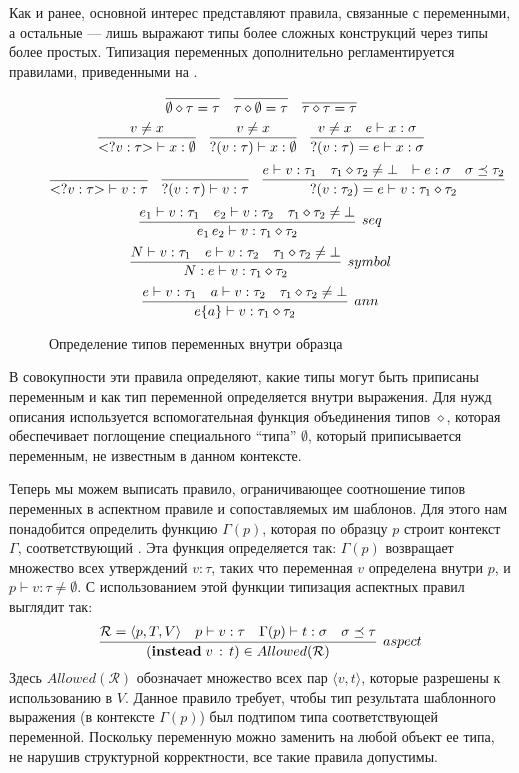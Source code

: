 Как и ранее, основной интерес представляют правила, связанные с переменными, а остальные --- лишь выражают типы более сложных конструкций через типы более простых. Типизация переменных дополнительно регламентируется правилами, приведенными на .
\newcommand{\tcomp}{\diamond}
\begin{figure}[htbp]
	\centering
$$
	\infer{\emptyset \tcomp \tau = \tau}{}
	\quad
	\infer{\tau \tcomp \emptyset = \tau}{}
	\quad
	\infer{\tau \tcomp \tau = \tau}{}
$$
$$
	\infer{\wcard{?v}{\tau} \vdash x : \emptyset}{v \neq x}
	\quad
	\infer{?(v : \tau) \vdash x : \emptyset}{v \neq x}
	\quad
	\infer{?(v : \tau) = e \vdash x : \sigma}{v \neq x & e \vdash x : \sigma}
$$
$$
	\infer{\wcard{?v}{\tau} \vdash v : \tau}{}
	\quad
	\infer{?(v : \tau) \vdash v : \tau}{}
	\quad
	\infer{?(v : \tau_2) = e \vdash v : \tau_1 \tcomp \tau_2}{
		e \vdash v : \tau_1 & 
		\tau_1 \tcomp \tau_2 \neq \bot &
		\vdash e : \sigma & \sigma \preceq \tau_2
	}
$$
$$
	\infer[seq]{e_1 \, e_2 \vdash v : \tau_1 \tcomp \tau_2}{
		e_1 \vdash v : \tau_1 & 
		e_2 \vdash v : \tau_2 & 
		\tau_1 \tcomp \tau_2 \neq \bot
	}
$$
$$
	\infer[symbol]{N : e \vdash v : \tau_1 \tcomp \tau_2}{
		N \vdash v : \tau_1 & 
		e \vdash v : \tau_2 & 
		\tau_1 \tcomp \tau_2 \neq \bot
	}
$$
$$
	\infer[ann]{e\{a\} \vdash v : \tau_1 \tcomp \tau_2}{
		e \vdash v : \tau_1 & 
		a \vdash v : \tau_2 & 
		\tau_1 \tcomp \tau_2 \neq \bot
	}
$$
	\caption{Определение типов переменных внутри образца}\label{VarTypes}
\end{figure}
В совокупности эти правила определяют, какие типы могут быть приписаны переменным и как тип переменной определяется внутри выражения. Для нужд описания используется вспомогательная функция объединения типов $\tcomp$, которая обеспечивает поглощение специального ``типа'' $\emptyset$, который приписывается переменным, не известным в данном контексте.

Теперь мы можем выписать правило, ограничивающее соотношение типов переменных в аспектном правиле и сопоставляемых им шаблонов. Для этого нам понадобится определить функцию $\Gamma(p)$, которая по образцу $p$ строит контекст $\Gamma$, соответствующий . Эта функция определяется так: $\Gamma(p)$ возвращает множество всех утверждений $v : \tau$, таких что переменная $v$ определена внутри $p$, и $p \vdash v : \tau \neq \emptyset$. С использованием этой функции типизация аспектных правил выглядит так:
$$
	\infer[aspect]{
		(\mathbf{instead} \; v \, : \, t) \in Allowed(\mathcal{R})
	}{
		\mathcal{R} = \langle p, T, V \rangle &
		p \vdash v : \tau &
		\Gamma(p) \vdash t : \sigma &
		\sigma \preceq \tau
	}
$$
Здесь $Allowed(\mathcal{R})$ обозначает множество всех пар $\langle v, t\rangle$, которые разрешены к использованию в $V$. Данное правило требует, чтобы тип результата шаблонного выражения (в контексте $\Gamma(p)$) был подтипом типа соответствующей переменной. Поскольку переменную можно заменить на любой объект ее типа, не нарушив структурной корректности, все такие правила допустимы.

